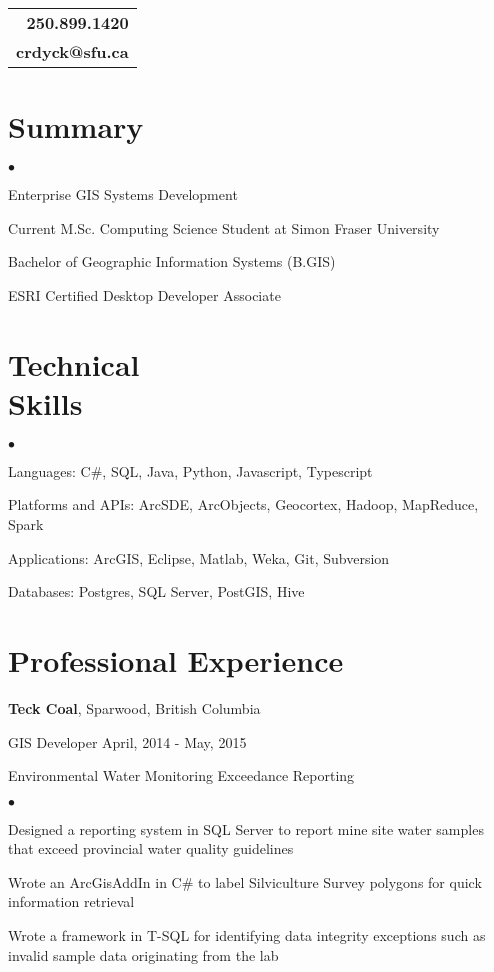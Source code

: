\documentclass[11pt,margin,line]{res}
\newenvironment{list2}{
  \begin{list}{$\bullet$}{%
      \setlength{\itemsep}{0in}
      \setlength{\parsep}{0in} \setlength{\parskip}{0in}
      \setlength{\topsep}{0in} \setlength{\partopsep}{0in} 
      \setlength{\leftmargin}{0.25in}}}{\end{list}}
\begin{document}
 \hfill
{\vspace{-.6cm}
\large\begin{tabular}[c]{r}
  \bf{250.899.1420} \\
  \bf{crdyck@sfu.ca}
\end{tabular}}

\begin{resume}
\vspace{.5cm}
\section{\sc Summary}
\begin{list2}
\item Enterprise GIS Systems Development
\item Current M.Sc. Computing Science Student at Simon Fraser University
\item Bachelor of Geographic Information Systems (B.GIS)
\item ESRI Certified Desktop Developer Associate
\end{list2}

\section{\sc Technical \\ Skills}
\begin{list2}
\item Languages:  C\#, SQL, Java, Python, Javascript, Typescript
\item Platforms and APIs: ArcSDE, ArcObjects, Geocortex, Hadoop, MapReduce, Spark
\item Applications:  ArcGIS, Eclipse, Matlab, Weka, Git, Subversion
\item Databases: Postgres, SQL Server, PostGIS, Hive
\end{list2}

\section{\sc Professional Experience}
{\bf Teck Coal}, Sparwood, British Columbia

\vspace{-.4cm}
GIS Developer \hfill {\wdates April, 2014 - May, 2015}

{\prj Environmental Water Monitoring Exceedance Reporting}
\vspace{.1cm}
\begin{list2}
\item Designed a reporting system in SQL Server to report mine site water samples that exceed provincial water quality guidelines
\item Wrote an ArcGisAddIn in C\# to label Silviculture Survey polygons for quick information retrieval
\item Wrote a framework in T-SQL for identifying data integrity exceptions such as invalid sample data originating from the lab
\end{list2}


\end{resume}
\end{document}

